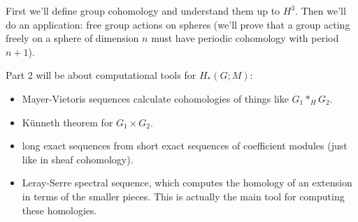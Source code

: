 First we'll define group cohomology and understand them up to $H^3$. Then we'll do an application: free group actions on spheres (we'll prove that a group acting freely on a sphere of dimension $n$ must have periodic cohomology with period $n+1$).

Part 2 will be about computational tools for $H_*(G;M)$:
\begin{itemize}
 \item Mayer-Vietoris sequences calculate cohomologies of things like $G_1\ast_H G_2$.
 \item K\"unneth theorem for $G_1\times G_2$.
 \item long exact sequences from short exact sequences of coefficient modules (just like in sheaf cohomology).
 \item Leray-Serre spectral sequence, which computes the homology of an extension in terms of the smaller pieces. This is actually the main tool for computing these homologies.
\end{itemize}

